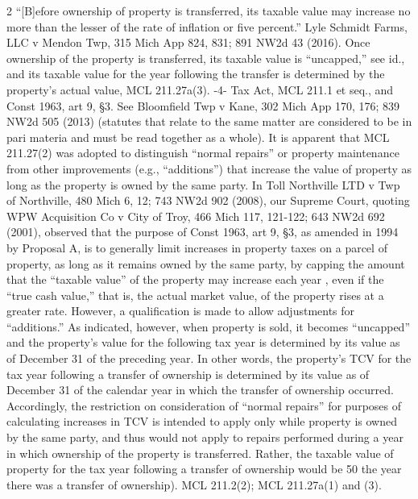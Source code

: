 \documentclass[12pt,\documentclassflag]{michiganCourtOfAppealsBrief}
\begin{document}
\begin{enumerate}
2
``[B]efore ownership of property is transferred, its taxable value may increase no more than the
lesser of the rate of inflation or five percent.'' Lyle Schmidt Farms, LLC v Mendon Twp, 315 Mich
App 824, 831; 891 NW2d 43 (2016). Once ownership of the property is transferred, its taxable
value is ``uncapped,'' see id., and its taxable value for the year following the transfer is determined
by the property's actual value, MCL 211.27a(3).
-4-
Tax Act, MCL 211.1 et seq., and Const 1963, art 9, \S 3. See Bloomfield Twp v Kane, 302 Mich
App 170, 176; 839 NW2d 505 (2013) (statutes that relate to the same matter are considered to be
in pari materia and must be read together as a whole). It is apparent that MCL 211.27(2) was
adopted to distinguish ``normal repairs'' or property maintenance from other improvements (e.g.,
``additions'') that increase the value of property as long as the property is owned by the same party.
In Toll Northville LTD v Twp of Northville, 480 Mich 6, 12; 743 NW2d 902 (2008), our Supreme
Court, quoting WPW Acquisition Co v City of Troy, 466 Mich 117, 121-122; 643 NW2d 692
(2001), observed that the purpose of Const 1963, art 9, \S 3, as amended in 1994 by Proposal A, is
to generally limit increases in property taxes on a parcel of property, as long as it
remains owned by the same party, by capping the amount that the ``taxable value''
of the property may increase each year , even if the ``true cash value,'' that is, the
actual market value, of the property rises at a greater rate. However, a qualification
is made to allow adjustments for ``additions.''
As indicated, however, when property is sold, it becomes ``uncapped'' and the property's value for
the following tax year is determined by its value as of December 31 of the preceding year. In other
words, the property's TCV for the tax year following a transfer of ownership is determined by its
value as of December 31 of the calendar year in which the transfer of ownership occurred.
Accordingly, the restriction on consideration of ``normal repairs'' for purposes of calculating
increases in TCV is intended to apply only while property is owned by the same party, and thus
would not apply to repairs performed during a year in which ownership of the property is
transferred. Rather, the taxable value of property for the tax year following a transfer of ownership
would be 50%
the year there was a transfer of ownership). MCL 211.2(2); MCL 211.27a(1) and (3).



\end{enumerate}
\end{document}
